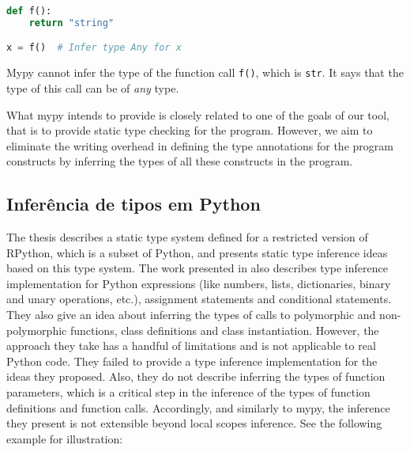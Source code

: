 \begin{lstlisting}[language=Python]
def f():
	return "string"

x = f()  # Infer type Any for x
\end{lstlisting}
Mypy cannot infer the type of the function call \lstinline|f()|, which is \lstinline|str|. It says that the type of this call can be of \textit{any} type.

What mypy intends to provide is closely related to one of the goals of our tool, that is to provide static type checking for the program. However, we aim to eliminate the writing overhead in defining the type annotations for the program constructs by inferring the types of all these constructs in the program.

\subsection{Inferência de tipos em Python \cite{porto}}
The thesis \cite{porto} describes a static type system defined for a restricted version of RPython, which is a subset of Python, and presents static type inference ideas based on this type system. The work presented in \cite{porto} also describes type inference implementation for Python expressions (like numbers, lists, dictionaries, binary and
unary operations, etc.), assignment statements and conditional statements. They also give an idea about inferring the types of calls to polymorphic and non-polymorphic functions, class definitions and class instantiation. However, the approach they take has a handful of limitations and is not applicable to real Python code. They failed to provide a type inference implementation for the ideas they proposed. Also, they do not describe inferring the types of function parameters, which is a critical step in the inference of the types of function definitions and function calls. Accordingly, and similarly to mypy, the inference they present is not extensible beyond local scopes inference.
See the following example for illustration:

